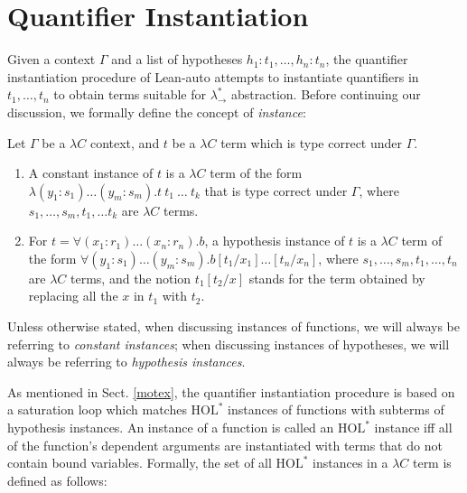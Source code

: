 \section{Quantifier Instantiation}\label{sectinst}
Given a context $\Gamma$ and a list of hypotheses $h_1 : t_1, \dots, h_n : t_n$, the quantifier
instantiation procedure of Lean-auto attempts to instantiate quantifiers in
$t_1, \dots, t_n$ to obtain terms suitable for $\lambda_\to^*$ abstraction.
Before continuing our discussion, we formally define the concept of \textit{instance}:

\begin{definition}
  Let $\Gamma$ be a $\lambda C$ context, and $t$ be a $\lambda C$ term which is type correct under $\Gamma$.
  \begin{enumerate}
    \item A constant instance of $t$ is a $\lambda C$ term of the
      form $\lambda (y_1 : s_1) \dots (y_m : s_m). t \ t_1 \ \dots \ t_k$ that is
      type correct under $\Gamma$, where $s_1, \dots, s_m, t_1, \dots t_k$ are $\lambda C$ terms.
    \item For $t = \forall (x_1 : r_1) \dots (x_n : r_n). b$, a hypothesis instance of
      $t$ is a $\lambda C$ term of the form $\forall (y_1 : s_1) \dots (y_m : s_m). b[t_1/x_1]\dots[t_n/x_n]$,
      where $s_1, \dots, s_m, t_1, \dots, t_n$ are $\lambda C$ terms, and the notion $t_1[t_2/x]$ stands
      for the term obtained by replacing all the $x$ in $t_1$ with $t_2$.
  \end{enumerate}
\end{definition}

Unless otherwise stated, when discussing instances of functions, we will always be
referring to \textit{constant instances}; when discussing instances of hypotheses, we will
always be referring to \textit{hypothesis instances}.

As mentioned in Sect. \ref{motex}, the quantifier instantiation procedure
is based on a saturation loop which matches $\text{HOL}^*$ instances of functions
with subterms of hypothesis instances. An instance of a function is called
an $\text{HOL}^*$ instance iff all of the function's dependent arguments are instantiated with terms
that do not contain bound variables. Formally, the set of all $\text{HOL}^*$ instances
in a $\lambda C$ term is defined as follows:

